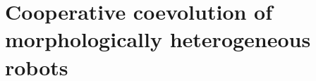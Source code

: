 \section{Cooperative coevolution of morphologically heterogeneous robots \cite{gomes2015cooperative}}
